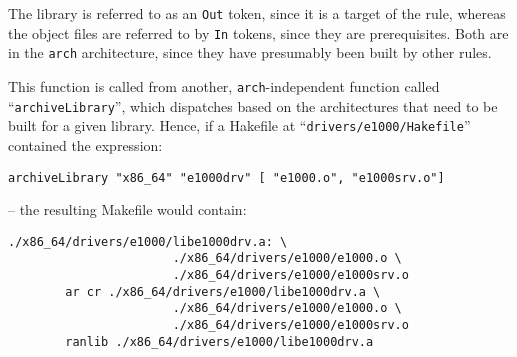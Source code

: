 \documentclass[a4paper,twoside]{report} %
\begin{document}
The library is referred to as an \texttt{Out} token, since it is a target
of the rule, whereas the object files are referred to by \texttt{In}
tokens, since they are prerequisites.   Both are in the \texttt{arch}
architecture, since they have presumably been built by other rules.

This function is called from another, \texttt{arch}-independent
function called ``\texttt{archiveLibrary}'', which dispatches based on
the architectures that need to be built for a given library.
Hence, if a Hakefile at ``\texttt{drivers/e1000/Hakefile}'' contained
the expression:
\begin{verbatim}
archiveLibrary "x86_64" "e1000drv" [ "e1000.o", "e1000srv.o"]
\end{verbatim}
-- the resulting Makefile would contain:
\begin{verbatim}
./x86_64/drivers/e1000/libe1000drv.a: \
                       ./x86_64/drivers/e1000/e1000.o \
                       ./x86_64/drivers/e1000/e1000srv.o
        ar cr ./x86_64/drivers/e1000/libe1000drv.a \
                       ./x86_64/drivers/e1000/e1000.o \
                       ./x86_64/drivers/e1000/e1000srv.o
        ranlib ./x86_64/drivers/e1000/libe1000drv.a
\end{verbatim}
\end{document}
